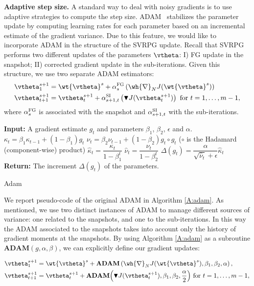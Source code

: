 \textbf{Adaptive step size.}
A standard way to deal with noisy gradients is to use adaptive strategies to compute the step size.
 \ac{ADAM}~\citep{kingma2014adam} stabilizes the parameter update by computing learning rates for each parameter based on an incremental estimate of the gradient variance.
Due to this feature, we would like to incorporate \acs{ADAM} in the structure of the \acs{SVRPG} update.
Recall that \acs{SVRPG} performs two different updates of the parameters $\vtheta$: I) \acs{FG} update in the snapshot; II) corrected gradient update in the sub-iterations.
Given this structure, we use two separate \acs{ADAM} estimators:
\begin{align*}
\vtheta^{s+1}_1 &= \wt{\vtheta}^s + \alpha^{\textsc{FG}}_s\left(\wh{\nabla}_N J(\wt{\vtheta}^s) \right)\\
\vtheta^{s+1}_{t+1} &= \vtheta^{s+1}_t + \alpha^{\textsc{SI}}_{s+1,t}\left( 
\blacktriangledown J(\vtheta^{s+1}_t)\right)
\text{ for $t=1,\dots,m-1$},
\end{align*}
where $\alpha^{\textsc{FG}}_{s}$ is associated with the snapshot and $\alpha^{\textsc{SI}}_{s+1,t}$ with the sub-iterations.
\begin{algorithm}[h]
	\begin{algorithmic}
		\STATE \textbf{Input:} A gradient estimate $g_t$ and parameters $\beta_1$, $\beta_2$, $\epsilon$ and $\alpha$.
		\STATE $\kappa_t = \beta_1 \kappa_{t-1} + (1 - \beta_1) g_t$
		\STATE $\nu_t = \beta_2 \nu_{t-1} + (1 - \beta_2) g_t \circ g_t$ ($\circ$ is the Hadamard (component-wise) product)
		\STATE $\hat{\kappa}_t = \dfrac{\kappa_t}{1 - \beta^t_1}$
		\STATE $\hat{\nu}_t = \dfrac{\nu_t}{1 - \beta^t_2}$
		\STATE $\Delta(g_t) = \dfrac{\alpha}{\sqrt{\hat{\nu}_t} + \epsilon} \hat{\kappa}_t$
		\STATE \textbf{Return:} The increment $\Delta(g_t)$  of the parameters.
	\end{algorithmic}
	\caption{
		\label{A:adam}
		Adam}
\end{algorithm}
We report pseudo-code of the original \acs{ADAM} \citep{kingma2014adam} in Algorithm \ref{A:adam}. As mentioned, we use two distinct instances of \acs{ADAM} to manage different sources of variance: one related to the snapshots, and one to the sub-iterations. In this way the \acs{ADAM} associated to the snapshots takes into account only the history of gradient moments at the snapshots. By using Algorithm \ref{A:adam} as a subroutine $\textbf{ADAM}(g,\alpha,\beta)$, we can explicitly define our gradient updates:

\begin{align*}
\vtheta^{s+1}_1 &= \wt{\vtheta}^s + \textbf{ADAM}\left(\wh{\nabla}_N J(\wt{\vtheta}^s),\beta_1,\beta_2,\alpha\right),\\
\vtheta^{s+1}_{t+1} &= \vtheta^{s+1}_t + \textbf{ADAM}\Big( 
\blacktriangledown J(\vtheta^{s+1}_t),\beta_1,\beta_2,\frac{\alpha}{2}\Big)
\text{ for $t=1,\dots,m-1$},
\end{align*}

